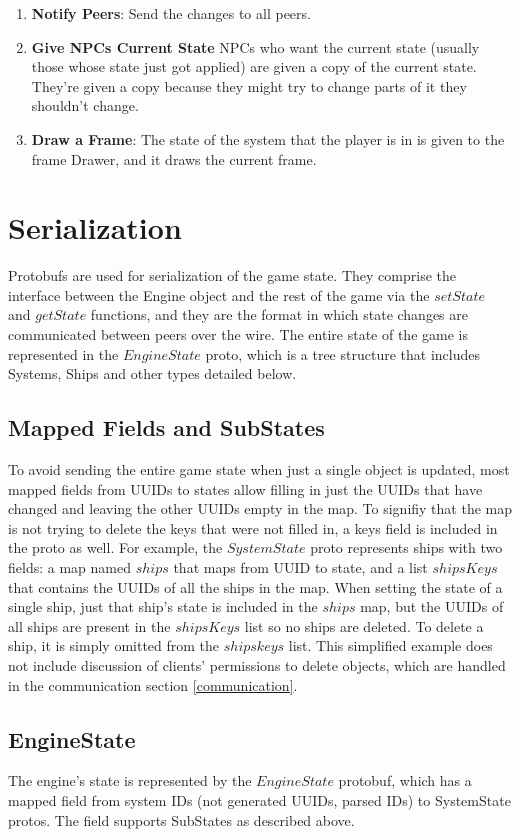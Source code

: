 \documentclass{article}
\begin{document}
\begin{enumerate}
\item \textbf{Notify Peers}: Send the changes to all peers.

\item \textbf{Give NPCs Current State} NPCs who want the current state (usually those whose state just got applied) are given a copy of the current state. They're given a copy because they might try to change parts of it they shouldn't change.
\item \textbf{Draw a Frame}: The state of the system that the player is in is given to the frame Drawer, and it draws the current frame.
\end{enumerate}

\section{Serialization}
Protobufs are used for serialization of the game state. They comprise the interface between the Engine object and the rest of the game via the $setState$ and $getState$ functions, and they are the format in which state changes are communicated between peers over the wire. The entire state of the game is represented in the $EngineState$ proto, which is a tree structure that includes Systems, Ships and other types detailed below.

\subsection{Mapped Fields and SubStates}
To avoid sending the entire game state when just a single object is updated, most mapped fields from UUIDs to states allow filling in just the UUIDs that have changed and leaving the other UUIDs empty in the map. To signifiy that the map is not trying to delete the keys that were not filled in, a keys field is included in the proto as well. For example, the $SystemState$ proto represents ships with two fields: a map named $ships$ that maps from UUID to state, and a list $shipsKeys$ that contains the UUIDs of all the ships in the map. When setting the state of a single ship, just that ship's state is included in the $ships$ map, but the UUIDs of all ships are present in the $shipsKeys$ list so no ships are deleted. To delete a ship, it is simply omitted from the $shipskeys$ list. This simplified example does not include discussion of clients' permissions to delete objects, which are handled in the communication section \ref{communication}.

\subsection{EngineState}
The engine's state is represented by the $EngineState$ protobuf, which has a mapped field from system IDs (not generated UUIDs, parsed IDs) to SystemState protos. The field supports SubStates as described above.
\end{document}
